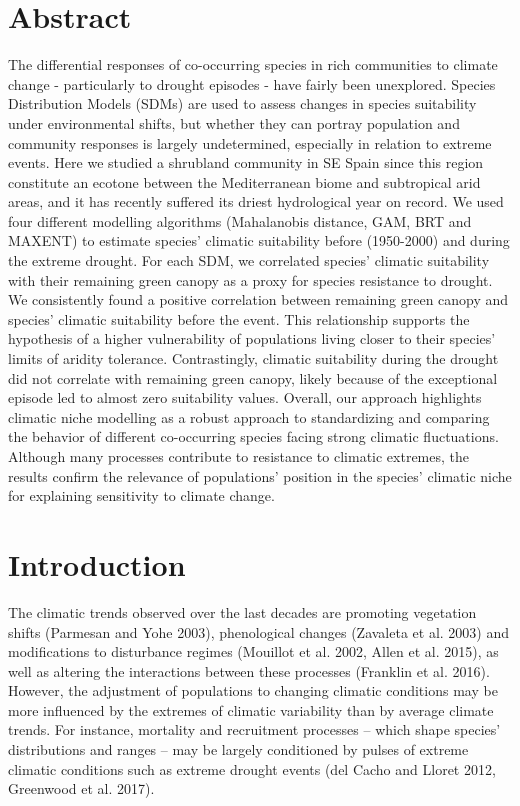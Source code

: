 \documentclass[11pt,twoside]{reedthesis}
\begin{document}
\section*{Abstract}

The differential responses of co-occurring species in rich communities
to climate change - particularly to drought episodes - have fairly been
unexplored. Species Distribution Models (SDMs) are used to assess
changes in species suitability under environmental shifts, but whether
they can portray population and community responses is largely
undetermined, especially in relation to extreme events. Here we studied
a shrubland community in SE Spain since this region constitute an
ecotone between the Mediterranean biome and subtropical arid areas, and
it has recently suffered its driest hydrological year on record. We used
four different modelling algorithms (Mahalanobis distance, GAM, BRT and
MAXENT) to estimate species' climatic suitability before (1950-2000) and
during the extreme drought. For each SDM, we correlated species'
climatic suitability with their remaining green canopy as a proxy for
species resistance to drought. We consistently found a positive
correlation between remaining green canopy and species' climatic
suitability before the event. This relationship supports the hypothesis
of a higher vulnerability of populations living closer to their species'
limits of aridity tolerance. Contrastingly, climatic suitability during
the drought did not correlate with remaining green canopy, likely
because of the exceptional episode led to almost zero suitability
values. Overall, our approach highlights climatic niche modelling as a
robust approach to standardizing and comparing the behavior of different
co-occurring species facing strong climatic fluctuations. Although many
processes contribute to resistance to climatic extremes, the results
confirm the relevance of populations' position in the species' climatic
niche for explaining sensitivity to climate change.\par

\newpage

\section{Introduction}\label{introduction-1}

The climatic trends observed over the last decades are promoting
vegetation shifts (Parmesan and Yohe 2003), phenological changes
(Zavaleta et al. 2003) and modifications to disturbance regimes
(Mouillot et al. 2002, Allen et al. 2015), as well as altering the
interactions between these processes (Franklin et al. 2016). However,
the adjustment of populations to changing climatic conditions may be
more influenced by the extremes of climatic variability than by average
climate trends. For instance, mortality and recruitment processes --
which shape species' distributions and ranges -- may be largely
conditioned by pulses of extreme climatic conditions such as extreme
drought events (del Cacho and Lloret 2012, Greenwood et al. 2017).\par
\end{document}
